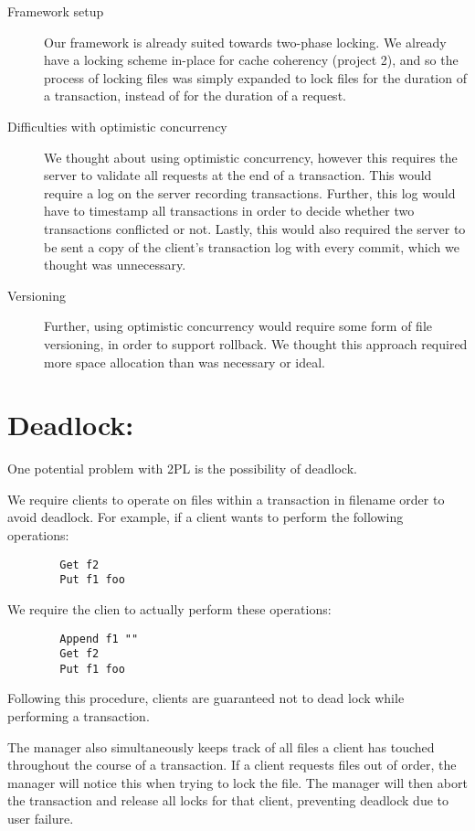 \documentclass[11pt]{article}
\begin{document}
\begin{description}
	\item[Framework setup] Our framework is already suited towards two-phase locking. We already have a locking scheme in-place for cache coherency (project 2), and so the process of locking files was 
simply expanded to lock files for the duration of a transaction, instead of for the duration of a request.
	\item[Difficulties with optimistic concurrency] We thought about using optimistic concurrency, however this requires the server to validate all requests at the end of a transaction. This would require a log on the server recording transactions. Further, this log would have to timestamp all transactions in order to decide whether two transactions conflicted or not. Lastly, this would also required the server to be sent a copy of the client's transaction log with every commit, which we thought was unnecessary. 
        \item[Versioning] Further, using optimistic concurrency would require some form of file versioning, in order to support rollback. We thought this approach required more space allocation than was necessary or ideal.
\end{description} 

\section{Deadlock:} 

One potential problem with 2PL is the possibility of deadlock.

We require clients to operate on files within a transaction in filename order to avoid deadlock.
For example, if a client wants to perform the following operations: 
\begin{verbatim}
        Get f2
        Put f1 foo
\end{verbatim}
We require the clien to actually perform these operations:
\begin{verbatim}
        Append f1 ""
        Get f2
        Put f1 foo
\end{verbatim}
Following this procedure, clients are guaranteed not to dead lock while performing a transaction.

The manager also simultaneously keeps track of all files a client has touched throughout the course of a transaction. If a client requests files out of order, the manager will notice this when trying to lock the file. The manager will then abort the transaction and release all locks for that client, preventing deadlock due to user failure.
\end{document}
